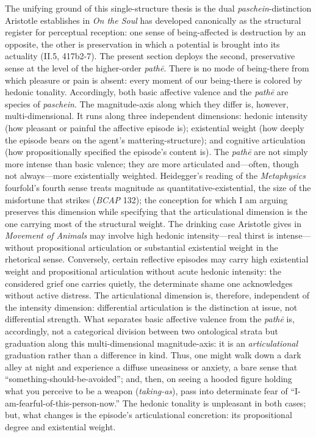 \documentclass{article}
\begin{document}
The unifying ground of this single-structure thesis is the dual \textit{paschein}-distinction Aristotle establishes in \textit{On the Soul} has developed canonically as the structural register for perceptual reception: one sense of being-affected is destruction by an opposite, the other is preservation in which a potential is brought into its actuality (II.5, 417b2-7). The present section deploys the second, preservative sense at the level of the higher-order \textit{pathē}. There is no mode of being-there from which pleasure or pain is absent: every moment of our being-there is colored by hedonic tonality. Accordingly, both basic affective valence and the \textit{pathē} are species of \textit{paschein}. The magnitude-axis along which they differ is, however, multi-dimensional. It runs along three independent dimensions: hedonic intensity (how pleasant or painful the affective episode is); existential weight (how deeply the episode bears on the agent's mattering-structure); and cognitive articulation (how propositionally specified the episode's content is). The \textit{pathē} are not simply more intense than basic valence; they are more articulated and---often, though not always---more existentially weighted. Heidegger's reading of the \textit{Metaphysics} fourfold's fourth sense treats magnitude as quantitative-existential, the size of the misfortune that strikes (\textit{BCAP} 132); the conception for which I am arguing preserves this dimension while specifying that the articulational dimension is the one carrying most of the structural weight. The drinking case Aristotle gives in \textit{Movement of Animals} may involve high hedonic intensity---real thirst is intense---without propositional articulation or substantial existential weight in the rhetorical sense. Conversely, certain reflective episodes may carry high existential weight and propositional articulation without acute hedonic intensity: the considered grief one carries quietly, the determinate shame one acknowledges without active distress. The articulational dimension is, therefore, independent of the intensity dimension: differential articulation is the distinction at issue, not differential strength. What separates basic affective valence from the \textit{pathē} is, accordingly, not a categorical division between two ontological strata but graduation along this multi-dimensional magnitude-axis: it is an \textit{articulational} graduation rather than a difference in kind. Thus, one might walk down a dark alley at night and experience a diffuse uneasiness or anxiety, a bare sense that ``something-should-be-avoided''; and, then, on seeing a hooded figure holding what you perceive to be a weapon (\textit{taking-as}), pass into determinate fear of ``I-am-fearful-of-this-person-now.'' The hedonic tonality is unpleasant in both cases; but, what changes is the episode's articulational concretion: its propositional degree and existential weight. 
\end{document}

